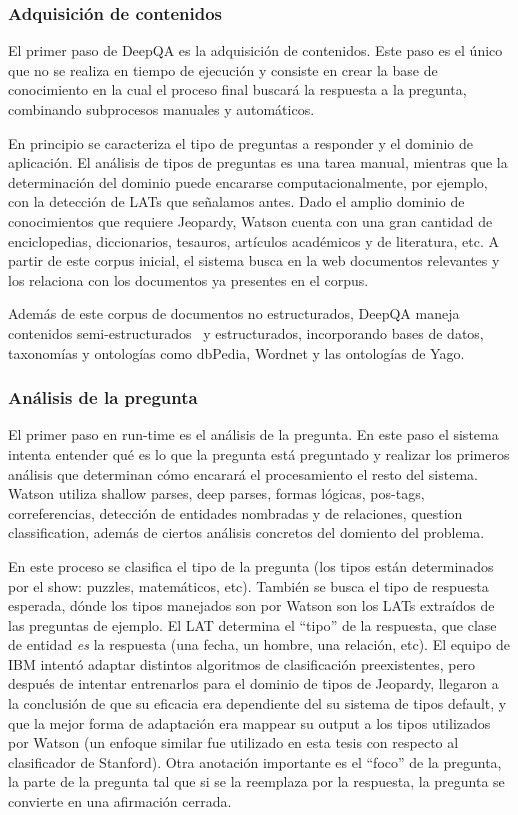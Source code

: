 \subsubsection{Adquisición de contenidos}

El primer paso de DeepQA es la adquisición de contenidos. Este paso es
el único que no se realiza en tiempo de ejecución y consiste en
crear la base de conocimiento en la cual el proceso final buscará la
respuesta a la pregunta, combinando subprocesos manuales y
automáticos. 

En principio se caracteriza el tipo de preguntas a responder y el
dominio de aplicación. El análisis de tipos de preguntas es una
tarea manual, mientras que la determinación del dominio puede
encararse computacionalmente, por ejemplo, con la detección de LATs
que señalamos antes. Dado el amplio dominio de conocimientos que
requiere Jeopardy, Watson cuenta con una gran cantidad de
enciclopedias, diccionarios, tesauros, artículos académicos y de
literatura, etc. A partir de este corpus inicial, el sistema busca en
la web documentos relevantes y los relaciona con los documentos ya
presentes en el corpus. 

Además de este corpus de documentos no estructurados, DeepQA maneja
contenidos semi-estructurados \ y estructurados, incorporando bases de
datos, taxonomías y ontologías como dbPedia, Wordnet y las
ontologías de Yago. 

\subsubsection{Análisis de la pregunta}

El primer paso en run-time es el análisis de la pregunta. En este paso
el sistema intenta entender qué es lo que la pregunta está
preguntado y realizar los primeros análisis que determinan cómo
encarará el procesamiento el resto del sistema. Watson utiliza
shallow parses, deep parses, formas lógicas, pos-tags,
correferencias, detección de entidades nombradas y de relaciones,
question classification, además de ciertos análisis concretos del
domiento del problema.

En este proceso se clasifica el tipo de la pregunta (los tipos están
determinados por el show: puzzles, matemáticos, etc). También se
busca el tipo de respuesta esperada, dónde los tipos manejados son
por Watson son los LATs extraídos de las preguntas de ejemplo. El LAT
determina el {\textquotedblleft}tipo{\textquotedblright} de la
respuesta, que clase de entidad \textit{es} la respuesta (una fecha, un
hombre, una relación, etc). El equipo de IBM intentó adaptar
distintos algoritmos de clasificación preexistentes, pero después
de intentar entrenarlos para el dominio de tipos de Jeopardy, llegaron
a la conclusión de que su eficacia era dependiente del su sistema de
tipos default, y que la mejor forma de adaptación era mappear su
output a los tipos utilizados por Watson (un enfoque similar fue
utilizado en esta tesis con respecto al clasificador de Stanford). Otra
anotación importante es el
{\textquotedblleft}foco{\textquotedblright} de la pregunta, la parte de
la pregunta tal que si se la reemplaza por la respuesta, la pregunta se
convierte en una afirmación cerrada.

